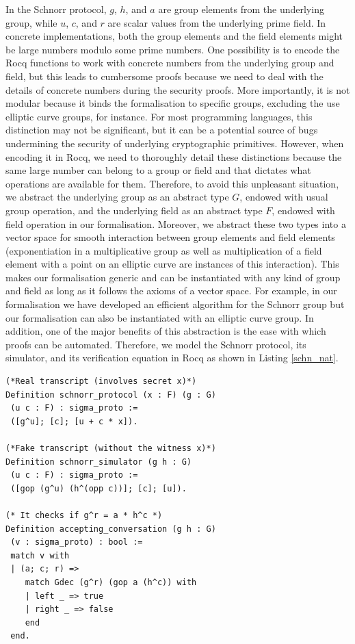\documentclass[sigconf, anonymous]{acmart}
\begin{document}
In the Schnorr protocol, $g$, $h$, and $a$ are group elements from the underlying group, while $u$, $c$, and $r$ are scalar values from the underlying prime field. In concrete implementations, both the group elements and the field elements might be large 
numbers modulo some prime numbers. 
One possibility is to encode the Rocq functions to work with concrete numbers from the underlying group and field, but this leads to cumbersome proofs because we need to deal with the details of concrete numbers during the security proofs. More importantly, it is not modular because it binds the formalisation to specific groups, excluding the use elliptic curve groups, for instance. For most programming languages, this distinction 
may not be significant, but it can be a potential source of bugs \cite{10.1007/978-3-662-63958-0_24} undermining the security of underlying cryptographic primitives. 
However, when encoding it in Rocq, we need to thoroughly detail these distinctions because 
the same large number can belong to a group or field and that dictates what operations are available for them. 
Therefore, to avoid this unpleasant situation,  
we abstract the underlying group as an abstract type $G$, endowed with 
usual group operation, and the underlying field as an abstract type $F$, endowed with 
field operation in our formalisation. 
Moreover, we abstract these two types into a vector space for smooth interaction between 
group elements and field elements (exponentiation in a multiplicative group as well as multiplication of a field element 
with a point on an elliptic curve are instances of this interaction). This 
makes our formalisation generic and can be instantiated with 
any kind of group and field as long as it follows the axioms of 
a vector space. For example, in our formalisation we have developed 
an efficient algorithm for the Schnorr group but our formalisation can 
also be instantiated with an elliptic curve group. In addition, 
one of the major benefits of this abstraction is the ease with which proofs 
can be automated. Therefore, we model the Schnorr 
protocol, its simulator, and its verification equation in Rocq as shown in 
Listing \ref{schn_nat}. 
\begin{lstlisting}[frame=single, language=Coq, caption={Schnorr protocol},
  label={schn_nat},captionpos=t, basicstyle=\ttfamily\footnotesize,
  abovecaptionskip=-\medskipamount]
(*Real transcript (involves secret x)*)
Definition schnorr_protocol (x : F) (g : G) 
 (u c : F) : sigma_proto :=  
 ([g^u]; [c]; [u + c * x]).

(*Fake transcript (without the witness x)*)
Definition schnorr_simulator (g h : G) 
 (u c : F) : sigma_proto := 
 ([gop (g^u) (h^(opp c))]; [c]; [u]).

(* It checks if g^r = a * h^c *)
Definition accepting_conversation (g h : G) 
 (v : sigma_proto) : bool :=
 match v with
 | (a; c; r) =>  
    match Gdec (g^r) (gop a (h^c)) with 
    | left _ => true
    | right _ => false 
    end
 end.
\end{lstlisting}
  
\end{document}
